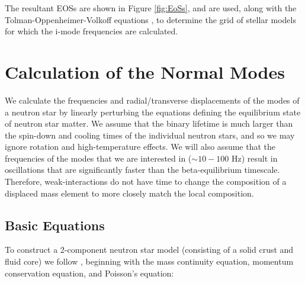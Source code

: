 \documentclass[fleqn,usenatbib]{mnras}
\begin{document}
The resultant EOSs are shown in Figure \ref{fig:EoSs}, and are used, along with the Tolman-Oppenheimer-Volkoff equations \citep{oppenheimer1939massive,tolman1939static}, to determine the grid of stellar models for which the i-mode frequencies are calculated. 


\section{Calculation of the Normal Modes}
\hspace{\parindent}We calculate the frequencies and radial/transverse displacements of the modes of a neutron star by linearly perturbing the equations defining the equilibrium state of neutron star matter. We assume that the binary lifetime is much larger than the spin-down and cooling times of the individual neutron stars, and so we may ignore rotation and high-temperature effects. We will also assume that the frequencies of the modes that we are interested in ($\sim 10 - 100$ Hz) result in oscillations that are significantly faster than the beta-equilibrium timescale. Therefore, weak-interactions do not have time to change the composition of a displaced mass element to more closely match the local composition.





\subsection{Basic Equations}
\hspace{\parindent}To construct a 2-component neutron star model (consisting of a solid crust and fluid core) we follow \citet{mcdermott1988nonradial}, beginning with the mass continuity equation, momentum conservation equation, and Poisson's equation:
\end{document}
